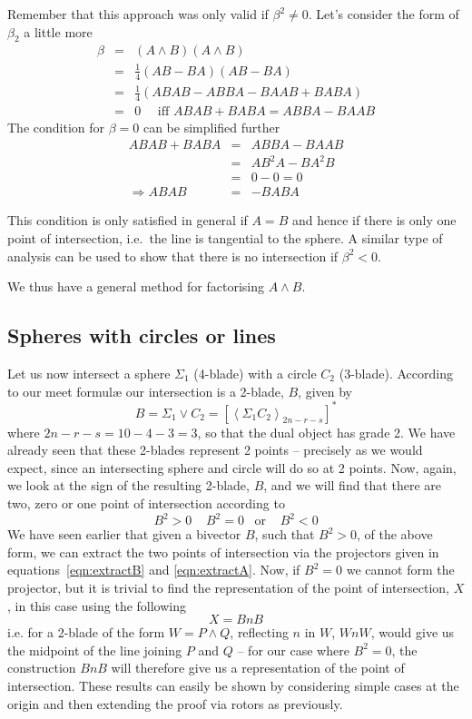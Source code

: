 Remember that this approach was only valid if $\beta^2 \ne 0$. Let's consider the
form of $\beta_2$ a little more 
\begin{eqnarray*}
\beta & = & (A \wedge B)(A \wedge B) \\
      & = & \frac{1}{4}(AB - BA)(AB - BA) \\
      & = & \frac{1}{4}(ABAB - ABBA - BAAB + BABA) \\
      & = & 0 \quad\mbox{ iff } ABAB + BABA = ABBA - BAAB
\end{eqnarray*}
The condition for $\beta = 0$ can be simplified further
\begin{eqnarray*}
ABAB + BABA & = & ABBA - BAAB \\
            & = & AB^2A - BA^2B \\
	    & = & 0 - 0 = 0 \\
\Rightarrow ABAB & = & -BABA 
\end{eqnarray*}

This condition is only satisfied in general if $A = B$ and hence 
if there is only one point of intersection, i.e.\ the line
is tangential to the sphere. A similar type of analysis can be used to
show that there is no intersection if $\beta^2 < 0$.

We thus have a general method for factorising $A \wedge B$.

\subsection{Spheres with circles or lines}

Let us now intersect a sphere $\Sigma_1$ (4-blade) with a
circle $C_2$ (3-blade). According to our meet formul\ae
our intersection is a 2-blade, $B$, given by
%
\begin{equation}
B = \Sigma_1 \vee C_2 = \left[\left< \Sigma_1 C_2
\right>_{2n-r-s}\right]^*
\end{equation}
%
where $2n-r-s=10-4-3=3$, so that the dual object has
grade 2. We have already seen that these 2-blades
represent 2 points -- precisely as we would expect, since
an intersecting sphere and circle will do so at 2 points.
Now, again, we look at the sign of the resulting 2-blade,
$B$, and we will find that there are two, zero or one
point of intersection according to
%
\[  B^2>0 \;\;\;\; B^2=0 \;\;\;\mbox{or}\;\;\;\; B^2<0
\]
%
We have seen earlier that given a bivector $B$, such that
$B^2>0$, of the above form, we can extract the two points
of intersection via the projectors given in
equations~\ref{eqn:extractB} and \ref{eqn:extractA}. Now, if $B^2=0$ we cannot form
the projector, but it is trivial to find the representation of the point of
intersection, $X$, in this case using the following
%
\[  X = BnB  \]
%
i.e. for a 2-blade of the form $W = P\wedge Q$, reflecting
$n$ in $W$, $WnW$, would give us the midpoint of the line
joining $P$ and $Q$ -- for our case where $B^2=0$, the
construction $BnB$ will therefore give us a representation of the point of
intersection. These results can easily be shown by
considering simple cases at the origin and then extending
the proof via rotors as previously.

